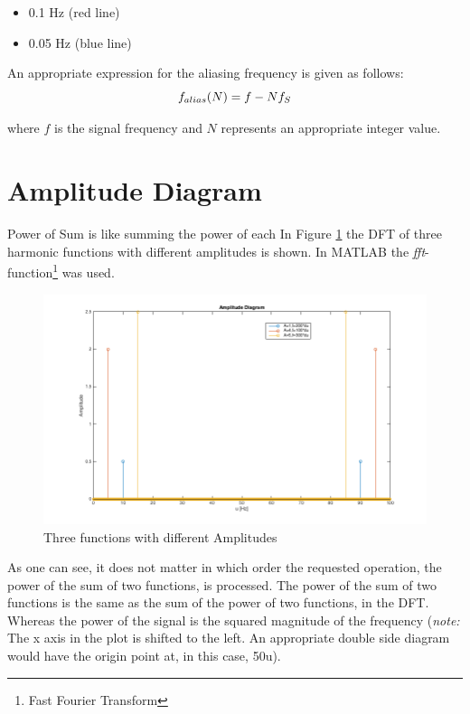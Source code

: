 \documentclass[12pt]{article}
\begin{document}
\begin{itemize}
	\item 0.1 Hz (red line)
	\item 0.05 Hz (blue line)
\end{itemize}

An appropriate expression for the aliasing frequency is given as follows:
\begin{equation}
\centering
	f_{alias}(N) = f - N f_{S}
	\label{eq:alias}
\end{equation}

where $f$ is the signal frequency and $N$ represents an appropriate integer value.


\addtocounter{section}{1}


\section{Amplitude Diagram}
Power of Sum is like summing the power of each
In Figure \ref{fig:amplitude} the DFT of three harmonic functions with different amplitudes is shown. In MATLAB the \textit{fft}-function\footnote{Fast Fourier Transform} was used.
\begin{figure}[h!]
	\centering
	\includegraphics[width=\linewidth]{images/ass1_4}	
	\caption{Three functions with different Amplitudes}
	\label{fig:amplitude}
\end{figure}

As one can see, it does not matter in which order the requested operation, the power of the sum of two functions, is processed. The power of the sum of two functions is the same as the sum of the power of two functions, in the DFT.
Whereas the power of the signal is the squared magnitude of the frequency (\textit{note:} The x axis in the plot is shifted to the left. An appropriate double side diagram would have the origin point at, in this case, 50u).
\end{document}
